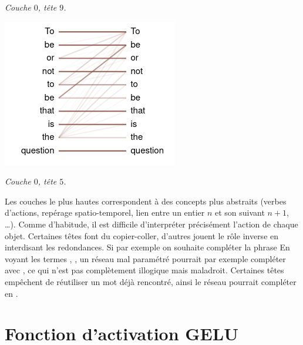 \documentclass[11pt,class=report,crop=false]{standalone}
\begin{document}
\begin{center}
\begin{minipage}{0.3\textwidth}
	\emph{Couche $0$, tête $9$.}
    \end{minipage}
    \quad
	\begin{minipage}{0.3\textwidth}
	\center
	\includegraphics[scale=\myscale,scale=0.5]{figures/attention_l0_h5}
	
	\emph{Couche $0$, tête $5$.}
   \end{minipage}

\end{center}


Les couches le plus hautes correspondent à des concepts plus abstraits (verbes d'actions, repérage spatio-temporel, lien entre un entier $n$ et son suivant $n+1$, \ldots). Comme d'habitude, il est difficile d'interpréter précisément l'action de chaque objet. 
Certaines têtes font du copier-coller, d'autres jouent le rôle inverse en interdisant les redondances. Si par exemple on souhaite compléter la phrase \og{}\fg{} En voyant les termes , ,  un réseau mal paramétré pourrait par exemple compléter avec , ce qui n'est pas complètement illogique mais maladroit. Certaines têtes empêchent de réutiliser un mot déjà rencontré, ainsi le réseau pourrait compléter en .



\section{Fonction d'activation GELU}


\end{document}

